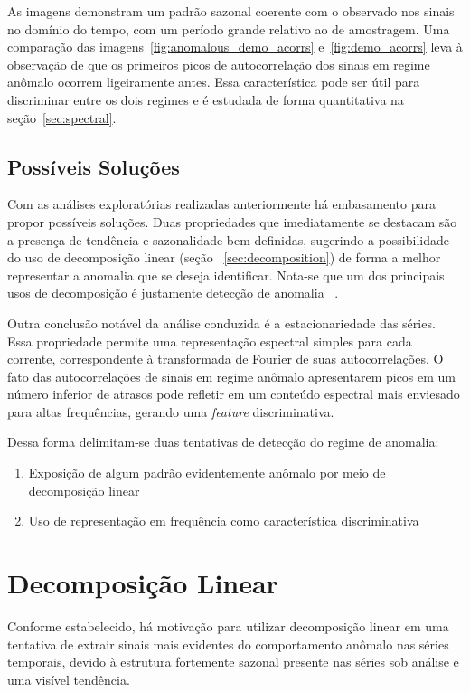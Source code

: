 As imagens demonstram um padrão sazonal coerente com o observado nos sinais no
domínio do tempo, com um período grande relativo ao de amostragem. Uma
comparação das imagens~\ref{fig:anomalous_demo_acorrs} e~\ref{fig:demo_acorrs}
leva à observação de que os primeiros picos de autocorrelação dos sinais em
regime anômalo ocorrem ligeiramente antes. Essa característica pode ser útil
para discriminar entre os dois regimes e é estudada de forma quantitativa
na seção~\ref{sec:spectral}.

\subsection{Possíveis Soluções}

Com as análises exploratórias realizadas anteriormente há embasamento para
propor possíveis soluções. Duas propriedades que imediatamente se destacam são
a presença de tendência e sazonalidade bem definidas, sugerindo a possibilidade
do uso de decomposição linear (seção ~\ref{sec:decomposition}) de forma a melhor
representar a anomalia que se deseja identificar. Nota-se que um dos principais
usos de decomposição é justamente detecção de anomalia
~\cite{anomaly_detection}.

Outra conclusão notável da análise conduzida é a estacionariedade das séries.
Essa propriedade permite uma representação espectral simples para cada
corrente, correspondente à transformada de Fourier de suas autocorrelações. O
fato das autocorrelações de sinais em regime anômalo apresentarem picos em um
número inferior de atrasos pode refletir em um conteúdo espectral mais
enviesado para altas frequências, gerando uma \emph{feature} discriminativa.

Dessa forma delimitam-se duas tentativas de detecção do regime de anomalia:

\begin{enumerate}
    \item Exposição de algum padrão evidentemente anômalo por meio de decomposição linear
    \item Uso de representação em frequência como característica discriminativa
\end{enumerate}

\section{Decomposição Linear}

Conforme estabelecido, há motivação para utilizar decomposição linear em uma
tentativa de extrair sinais mais evidentes do comportamento anômalo nas séries
temporais, devido à estrutura fortemente sazonal presente nas séries sob
análise e uma visível tendência.

